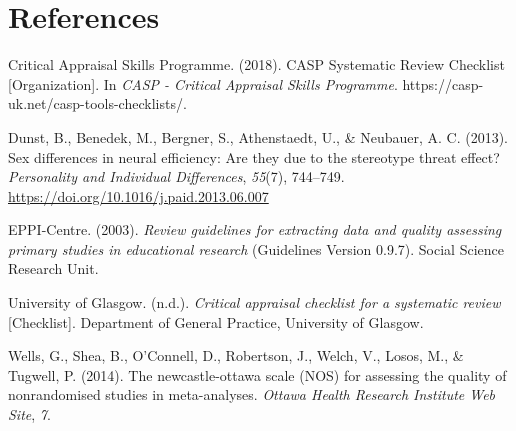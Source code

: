 \documentclass[
  doc, a4paper]{apa7}
\newlength{\cslhangindent}
\newenvironment{CSLReferences}[2] %
 {\begin{list}{}{%
  \setlength{\itemindent}{0pt}
  \setlength{\leftmargin}{0pt}
  \setlength{\parsep}{0pt}
  \ifodd #1
   \setlength{\leftmargin}{\cslhangindent}
   \setlength{\itemindent}{-1\cslhangindent}
  \fi
  \setlength{\itemsep}{#2\baselineskip}}}
 {\end{list}}
\begin{document}
\section{References}\label{references}

\label{refs}
\begin{CSLReferences}{1}{0}
Critical Appraisal Skills Programme. (2018). {CASP Systematic Review Checklist} {[}Organization{]}. In \emph{CASP - Critical Appraisal Skills Programme}. https://casp-uk.net/casp-tools-checklists/.

Dunst, B., Benedek, M., Bergner, S., Athenstaedt, U., \& Neubauer, A. C. (2013). Sex differences in neural efficiency: {Are} they due to the stereotype threat effect? \emph{Personality and Individual Differences}, \emph{55}(7), 744--749. \url{https://doi.org/10.1016/j.paid.2013.06.007}

EPPI-Centre. (2003). \emph{Review guidelines for extracting data and quality assessing primary studies in educational research} (Guidelines Version 0.9.7). Social Science Research Unit.

University of Glasgow. (n.d.). \emph{Critical appraisal checklist for a systematic review} {[}Checklist{]}. Department of General Practice, University of Glasgow.

Wells, G., Shea, B., O'Connell, D., Robertson, J., Welch, V., Losos, M., \& Tugwell, P. (2014). The newcastle-ottawa scale ({NOS}) for assessing the quality of nonrandomised studies in meta-analyses. \emph{Ottawa Health Research Institute Web Site}, \emph{7}.

\end{CSLReferences}
\end{document}
